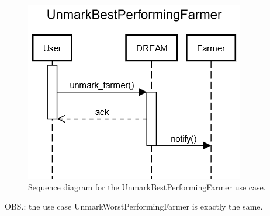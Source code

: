 \documentclass{article}
\begin{document}
\begin{figure}[H]
    \centering
	\includegraphics[scale=0.5]{sequence_diagrams/UnmarkBestPerformingFarmer.png}
    \caption{Sequence diagram for the UnmarkBestPerformingFarmer use case.}
\end{figure}

OBS.: the use case UnmarkWorstPerformingFarmer is exactly the same.
\newpage

\end{document}
